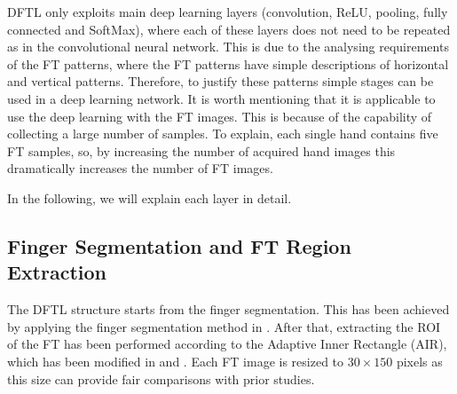 \documentclass[conference]{IEEEtran}
\begin{document}
DFTL only exploits main deep learning layers (convolution, ReLU, pooling, fully connected and SoftMax), where each of these layers does not need to be repeated as in the convolutional neural network. This is due to the analysing requirements of the FT patterns, where the FT patterns have simple descriptions of horizontal and vertical patterns. Therefore, to justify these patterns simple stages can be used in a deep learning network. It is worth mentioning that it is applicable to use the deep learning with the FT images. This is because of the capability of collecting a large number of samples. To explain, each single hand contains five FT samples, so, by increasing the number of acquired hand images this dramatically increases the number of FT images. 

In the following, we will explain each layer in detail.

\subsection{Finger Segmentation and FT Region Extraction}
The DFTL structure starts from the finger segmentation. This has been achieved by applying the finger segmentation method in \cite{Al-Nima2017Robust}. After that, extracting the ROI of the FT has been performed according to the Adaptive Inner Rectangle (AIR), which has been modified in \cite{Al-Nima2017Robust} and \cite{Al-Nima2017efficient}. Each FT image is resized to $30 \times 150$ pixels as this size can provide fair comparisons with prior studies.
\end{document}
